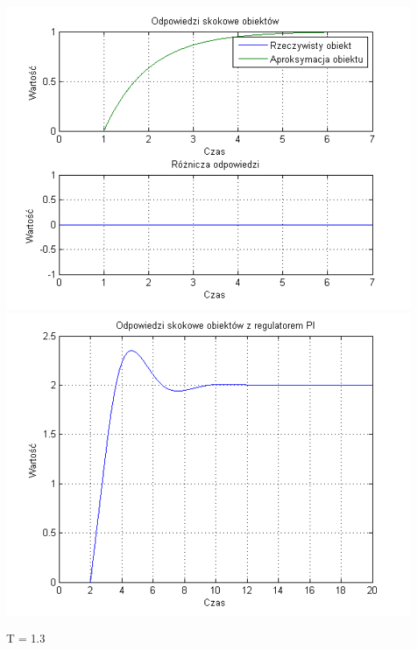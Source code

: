 \documentclass[10pt,a4paper]{article}
\begin{document}
\begin{center}
\includegraphics[scale=1]{images/jeden/skrypt_15.png}\\
\includegraphics[scale=1]{images/jeden/skrypt_16.png}\\
\end{center}
\newpage
T = 1.3
\end{document}

